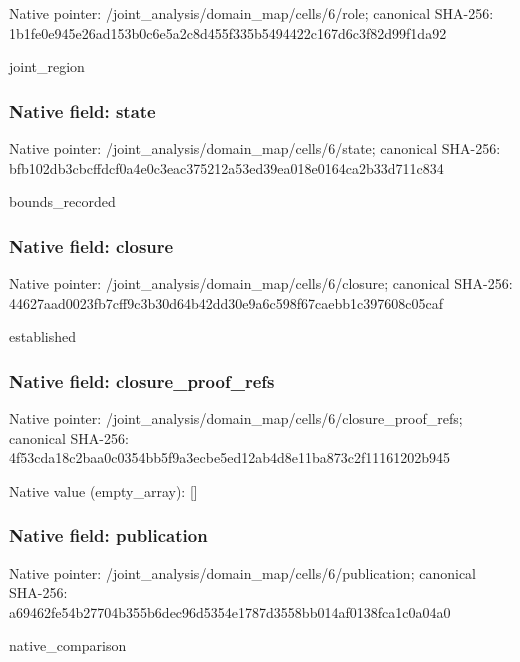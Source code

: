 \documentclass[10pt,a4paper]{article}
\begin{document}
Native pointer: /joint\_analysis/domain\_map/cells/6/role; canonical SHA-256: 1b1fe0e945e26ad153b0c6e5\allowbreak{}a2c8d455f335b5494422c167\allowbreak{}d6c3f82d99f1da92


joint\_region


\subsubsection{Native field: state}


Native pointer: /joint\_analysis/domain\_m\allowbreak{}ap/cells/6/state; canonical SHA-256: bfb102db3cbcffdcf0a4e0c3\allowbreak{}eac375212a53ed39ea018e01\allowbreak{}64ca2b33d711c834


bounds\_recorded


\subsubsection{Native field: closure}


Native pointer: /joint\_analysis/domain\_m\allowbreak{}ap/cells/6/closure; canonical SHA-256: 44627aad0023fb7cff9c3b30\allowbreak{}d64b42dd30e9a6c598f67cae\allowbreak{}bb1c397608c05caf


established


\subsubsection{Native field: closure\_proof\_refs}


Native pointer: /joint\_analysis/domain\_m\allowbreak{}ap/cells/6/closure\_proof\allowbreak{}\_refs; canonical SHA-256: 4f53cda18c2baa0c0354bb5f\allowbreak{}9a3ecbe5ed12ab4d8e11ba87\allowbreak{}3c2f11161202b945



Native value (empty\_array): []



\subsubsection{Native field: publication}


Native pointer: /joint\_analysis/domain\_m\allowbreak{}ap/cells/6/publication; canonical SHA-256: a69462fe54b27704b355b6de\allowbreak{}c96d5354e1787d3558bb014a\allowbreak{}f0138fca1c0a04a0


native\_comparison
\end{document}
